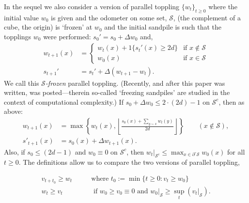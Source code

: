 \documentclass[12pt]{amsart}
\begin{document}
In the sequel we also consider a version of parallel toppling $\{w_t\}_{t \geq 0}$ where 
the initial value $w_0$ is given and the odometer on some set, $\mathcal{S}$, (the complement of a cube, the origin) is `frozen' at $w_0$ 
and the initial sandpile is such that the topplings $w_0$ were performed: $s_0' = s_0 + \Delta w_0$ and, 
\begin{equation} \label{eq:frozen_parallel_toppling}
\begin{aligned}
w_{t+1}(x) &=
\begin{cases}
w_{t}(x) + 1 \{ s_{t}'(x) \geq 2 d \}  &\mbox{if $x \not \in \mathcal{S}$} \\
w_0(x)  &\mbox{if $x \in \mathcal{S}$}
\end{cases} \\
s_{t+1}' &= s_{t}' + \Delta (w_{t+1} - w_{t}).
\end{aligned} 
\end{equation}
We call this {\it $\mathcal{S}$-frozen} parallel toppling. (Recently, and after this paper was written, \cite{goles2021freezing} was posted---therein so-called `freezing sandpiles' are studied in the context of computational complexity.) 
If $s_0 + \Delta w_0 \leq 2 \cdot (2 d)-1$ on $\mathcal{S}^c$, then as above:
\begin{equation} \label{eq:frozen_parallel_toppling_recurse}
\begin{aligned}
w_{t+1}(x)&=\max\left\{w_t(x),
\left\lfloor\frac{s_0(x)+\sum_{y\sim x}w_t(y)}{2d}\right\rfloor
\right\}\qquad(x\notin\mathcal S),\\
s'_{t+1}(x)&=s_0(x)+\Delta w_{t+1}(x).
\end{aligned}
\end{equation}
Also, if $s_0 \leq (2 d-1)$ and $w_0 \equiv 0$ on $\mathcal{S}^c$, then $w_t |_{\mathcal{S}^c} \leq \max_{x \in \partial^{\circ} \mathcal{S}} w_0(x)$ for all $t \geq 0$.
The definitions allow us to compare the two versions of parallel toppling,

\begin{equation} \label{eq:odometer_wave_comp}
\begin{aligned}
v_{t + t_0} \geq w_t  \qquad &\mbox{where $t_0:=  \min\{ t \geq 0 : v_{t} \geq w_0 \}$} \\
w_t \geq v_t  \qquad &\mbox{ if $w_0 \geq v_0 \equiv 0$ and $w_0|_{\mathcal{S}} \geq \sup_{t} (v_t|_{\mathcal{S}})$}.
\end{aligned}
\end{equation}
\end{document}
